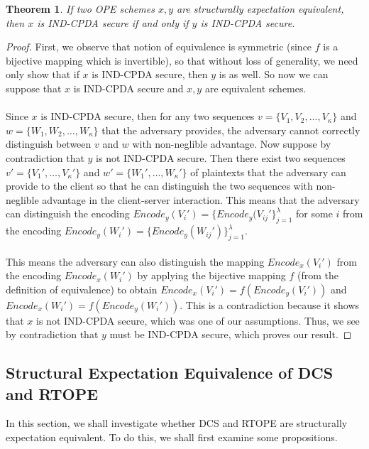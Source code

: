 \documentclass[12pt]{article}
\newtheorem{theorem}{Theorem}
\begin{document}
\begin{theorem}
 If two OPE schemes $x,y$ are structurally expectation equivalent, then $x$ is IND-CPDA secure if and only if $y$ is IND-CPDA secure.
\end{theorem}
\begin{proof}
First, we observe that notion of equivalence is symmetric (since $f$ is a bijective mapping which is invertible), so that without loss of generality, we need only show that if $x$ is IND-CPDA secure, then $y$ is as well. So now we can suppose that $x$ is IND-CPDA secure and $x,y$ are equivalent schemes. \\ \\
Since $x$ is IND-CPDA secure, then for any two sequences $v = \{V_1, V_2, \ldots, V_{\kappa}\}$ and $w = \{W_1, W_2, \ldots, W_{\kappa} \}$ that the adversary provides, the adversary cannot correctly distinguish between $v$ and $w$ with non-neglible advantage. Now suppose by contradiction that $y$ is not IND-CPDA secure. Then there exist two sequences $v' = \{V_1', \ldots, V_{\kappa}'\}$ and $w' = \{W_1', \ldots, W_{\kappa}'\}$ of plaintexts that the adversary can provide to the client so that he can distinguish the two sequences with non-neglible advantage in the client-server interaction. This means that the adversary can distinguish the encoding $Encode_y(V_i') = \{Encode_y(V_{ij}' \}_{j=1}^{\lambda}$ for some $i$ from the encoding $Encode_y(W_i') = \{Encode_y(W_{ij}') \}_{j=1}^{\lambda}$. \\ \\
This means the adversary can also distinguish the mapping $Encode_x(V_i')$ from the encoding $Encode_x(W_i')$ by applying the bijective mapping $f$ (from the definition of equivalence) to obtain $Encode_x(V_i') = f(Encode_y(V_i'))$ and $Encode_x(W_i') = f(Encode_y(W_i'))$. This is a contradiction because it shows that $x$ is not IND-CPDA secure, which was one of our assumptions. Thus, we see by contradiction that $y$ must be IND-CPDA secure, which proves our result.
\end{proof}

\subsection{Structural Expectation Equivalence of DCS and RTOPE}

In this section, we shall investigate whether DCS and RTOPE are structurally expectation equivalent. To do this, we shall first examine some propositions. 
\end{document}
